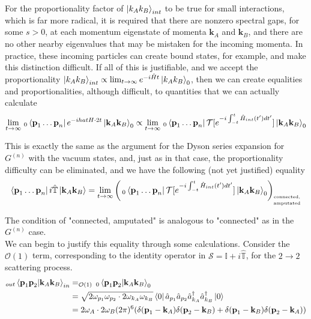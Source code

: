 \noindent For the proportionality factor of $\ket{k_A k_B}_{int}$ to be true for small interactions, which is far more radical, it is required that there are nonzero spectral gaps, for some $s>0$, at each momentum eigenstate of momenta $\textbf{k}_A$ and $\textbf{k}_B$, and there are no other nearby eigenvalues that may be mistaken for the incoming momenta. In practice, these incoming particles can create bound states, for example, and make this distinction difficult. If all of this is justifiable, and we accept the proportionality $\ket{k_A k_B}_{int} \propto \lim_{t\to\infty} e^{-i\hat{H}t} \ket{k_A k_B}_0$, then we can create equalities and proportionalities, although difficult, to quantities that we can actually calculate
\begin{equation}
\lim_{t\to\infty} \,_{0}\bra{\textbf{p}_1 \dots \textbf{p}_n} e^{-i hat{H} \cdot 2t} \ket{\textbf{k}_A \textbf{k}_B}_0 \propto \lim_{t\to\infty} \,_{0}\bra{\textbf{p}_1 \dots \textbf{p}_n} \mathcal{T}[ e^{-i \int^t_{-t} \hat{H}_{int}(t')dt'}] \ket{\textbf{k}_A \textbf{k}_B}_0
\end{equation}

\noindent This is exactly the same as the argument for the Dyson series expansion for $G^{(n)}$ with the vacuum states, and, just as in that case, the proportionality difficulty can be eliminated, and we have the following (not yet justified) equality
\begin{equation}
\bra{\textbf{p}_1 \dots \textbf{p}_n} i\hat{\mathbb{T}} \ket{\textbf{k}_A \textbf{k}_B} = \lim_{t\to\infty} \left( \,_{0}\bra{\textbf{p}_1 \dots \textbf{p}_n} \mathcal{T}[ e^{-i \int^t_{-t} \hat{H}_{int}(t')dt'}] \ket{\textbf{k}_A \textbf{k}_B}_0 \right)_{\tiny \stackanchor{connected,}{amputated}}
\end{equation}

\noindent The condition of "connected, amputated" is analogous to "connected" as in the $G^{(n)}$ case. \\

\noindent We can begin to justify this equality through some calculations. Consider the $\mathcal{O}(1)$ term, corresponding to the identity operator in  $\mathcal{S} = \mathbb{I} + i \hat{\mathbb{T}}$, for the $2\to 2$ scattering process.
\begin{align}
_{out}\braket{\textbf{p}_1 \textbf{p}_2 | \textbf{k}_A \textbf{k}_B}_{in} &=_{\mathcal{O}(1)} \,_{0}\braket{\textbf{p}_1 \textbf{p}_2 | \textbf{k}_A \textbf{k}_B}_{0} \\
&= \sqrt{2\omega_{p_1}\omega_{p_2}\cdot 2 \omega_{k_A}\omega_{k_B}} \bra{0} \hat{a}_{p_1} \hat{a}_{p_2} \hat{a}_{k_A}^\dagger \hat{a}_{k_B}^\dagger \ket{0} \\
&= 2\omega_A \cdot 2\omega_B (2\pi)^6 (\delta(\textbf{p}_1-\textbf{k}_A)\delta(\textbf{p}_2-\textbf{k}_B) + \delta(\textbf{p}_1-\textbf{k}_B)\delta(\textbf{p}_2-\textbf{k}_A))
\end{align}

